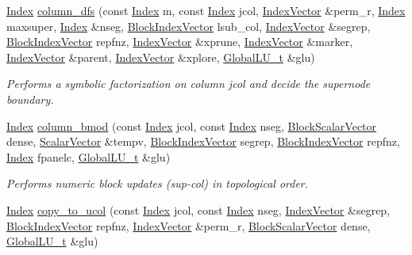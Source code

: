 \begin{DoxyCompactItemize}
\hyperlink{namespace_eigen_a62e77e0933482dafde8fe197d9a2cfde}{Index} \hyperlink{group___sparse_l_u___module_a6f543ae02eb6467e9bcc1e5cec8ccdd2}{column\+\_\+dfs} (const \hyperlink{namespace_eigen_a62e77e0933482dafde8fe197d9a2cfde}{Index} m, const \hyperlink{namespace_eigen_a62e77e0933482dafde8fe197d9a2cfde}{Index} jcol, \hyperlink{group___core___module}{Index\+Vector} \&perm\+\_\+r, \hyperlink{namespace_eigen_a62e77e0933482dafde8fe197d9a2cfde}{Index} maxsuper, \hyperlink{namespace_eigen_a62e77e0933482dafde8fe197d9a2cfde}{Index} \&nseg, \hyperlink{group___core___module_class_eigen_1_1_ref}{Block\+Index\+Vector} lsub\+\_\+col, \hyperlink{group___core___module}{Index\+Vector} \&segrep, \hyperlink{group___core___module_class_eigen_1_1_ref}{Block\+Index\+Vector} repfnz, \hyperlink{group___core___module}{Index\+Vector} \&xprune, \hyperlink{group___core___module}{Index\+Vector} \&marker, \hyperlink{group___core___module}{Index\+Vector} \&parent, \hyperlink{group___core___module}{Index\+Vector} \&xplore, \hyperlink{struct_eigen_1_1internal_1_1_l_u___global_l_u__t}{Global\+L\+U\+\_\+t} \&glu)
\begin{DoxyCompactList}\small\item\em Performs a symbolic factorization on column jcol and decide the supernode boundary. \end{DoxyCompactList}\item 
\hyperlink{namespace_eigen_a62e77e0933482dafde8fe197d9a2cfde}{Index} \hyperlink{group___sparse_l_u___module_ae34275602cf12560edfcaf7cd5cbe932}{column\+\_\+bmod} (const \hyperlink{namespace_eigen_a62e77e0933482dafde8fe197d9a2cfde}{Index} jcol, const \hyperlink{namespace_eigen_a62e77e0933482dafde8fe197d9a2cfde}{Index} nseg, \hyperlink{group___core___module_class_eigen_1_1_ref}{Block\+Scalar\+Vector} dense, \hyperlink{group___core___module}{Scalar\+Vector} \&tempv, \hyperlink{group___core___module_class_eigen_1_1_ref}{Block\+Index\+Vector} segrep, \hyperlink{group___core___module_class_eigen_1_1_ref}{Block\+Index\+Vector} repfnz, \hyperlink{namespace_eigen_a62e77e0933482dafde8fe197d9a2cfde}{Index} fpanelc, \hyperlink{struct_eigen_1_1internal_1_1_l_u___global_l_u__t}{Global\+L\+U\+\_\+t} \&glu)
\begin{DoxyCompactList}\small\item\em Performs numeric block updates (sup-\/col) in topological order. \end{DoxyCompactList}\item 
\hyperlink{namespace_eigen_a62e77e0933482dafde8fe197d9a2cfde}{Index} \hyperlink{group___sparse_l_u___module_ae4867ed1d5f104f9245411c356416a21}{copy\+\_\+to\+\_\+ucol} (const \hyperlink{namespace_eigen_a62e77e0933482dafde8fe197d9a2cfde}{Index} jcol, const \hyperlink{namespace_eigen_a62e77e0933482dafde8fe197d9a2cfde}{Index} nseg, \hyperlink{group___core___module}{Index\+Vector} \&segrep, \hyperlink{group___core___module_class_eigen_1_1_ref}{Block\+Index\+Vector} repfnz, \hyperlink{group___core___module}{Index\+Vector} \&perm\+\_\+r, \hyperlink{group___core___module_class_eigen_1_1_ref}{Block\+Scalar\+Vector} dense, \hyperlink{struct_eigen_1_1internal_1_1_l_u___global_l_u__t}{Global\+L\+U\+\_\+t} \&glu)

\end{DoxyCompactItemize}
